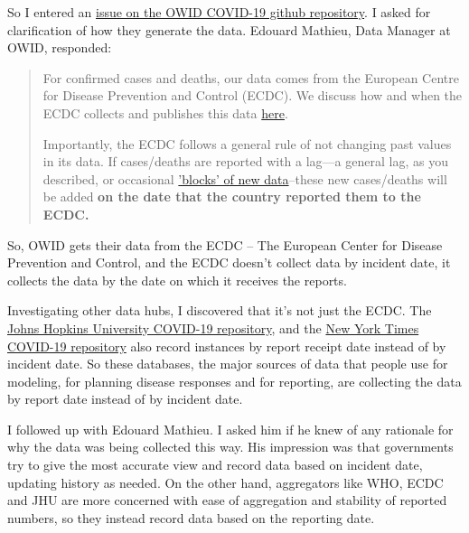 \documentclass[10pt,reqno]{amsart}
\begin{document}
So I entered an
\href{https://github.com/owid/covid-19-data/issues/41}{issue on the
  OWID COVID-19 github repository}.  I asked for clarification of how
they generate the data.  Edouard Mathieu, Data Manager at OWID,
responded:
\begin{quotation}
  For confirmed cases and deaths, our data comes from the European
  Centre for Disease Prevention and Control (ECDC). We discuss how and
  when the ECDC collects and publishes this data \href{https://ourworldindata.org/coronavirus#our-world-in-data-relies-on-data-from-the-european-cdc}{here}.

  Importantly, the ECDC follows a general rule of not changing past
  values in its data. If cases/deaths are reported with a lag—a general
  lag, as you described, or occasional
  \href{https://www.theguardian.com/us-news/2020/apr/15/new-york-city-coronavirus-death-toll-jumps-revised-count}{'blocks'
    of new data}--these new
  cases/deaths will be added \bf{on the date that the country reported them
    to the ECDC.}
\end{quotation}

So, OWID gets their data from the ECDC -- The European Center for
Disease Prevention and Control, and the ECDC doesn't collect data by
incident date, it collects the data by the date on which it receives
the reports.

Investigating other data hubs, I discovered that it's not just the
ECDC.  The \href{https://github.com/CSSEGISandData/COVID-19}{Johns
  Hopkins University COVID-19 repository}, and the
\href{https://github.com/nytimes/covid-19-data}{New York Times
  COVID-19 repository} also record instances by report receipt date
instead of by incident date.  So these databases, the major sources of
data that people use for modeling, for planning disease responses and
for reporting, are collecting the data by report date instead of by
incident date.\nocite{JHU2020data,NYT2020data}

I followed up with Edouard Mathieu.  I asked him if he knew of any
rationale for why the data was being collected this way.  His
impression was that governments try to give the most accurate view and
record data based on incident date, updating history as needed.  On
the other hand, aggregators like WHO, ECDC and JHU are more concerned
with ease of aggregation and stability of reported numbers, so they
instead record data based on the reporting date.\cite{Mathieu2020Dates}

\end{document}
